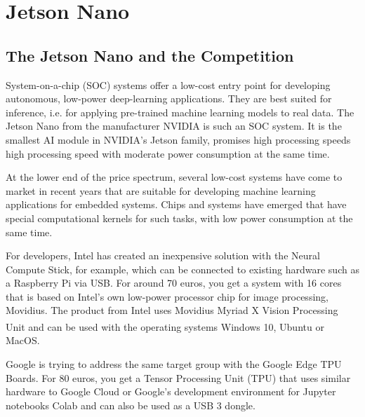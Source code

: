 %
%
%



\chapter{Jetson Nano}

\section{The Jetson Nano and the Competition}

System-on-a-chip (SOC) systems offer a low-cost entry point for developing autonomous, low-power deep-learning applications. They are best suited for inference, i.e. for applying 
pre-trained machine learning models to real data. The Jetson Nano from the manufacturer NVIDIA is such an SOC system. It is the smallest AI module in NVIDIA's Jetson family, promises high processing speeds 
high processing speed with moderate power consumption at the same time. \cite{JetsonGettingStarted:2019}



\bigskip

At the lower end of the price spectrum, several low-cost systems have come to market in recent years that are suitable for developing machine learning applications for embedded systems. Chips and systems have emerged that have special computational kernels for such tasks, with low power consumption at the same time.

For developers, Intel has created an inexpensive solution with the Neural Compute Stick, for example, which can be connected to existing hardware such as a Raspberry Pi via USB. For around 70 euros, you get a system with 16 cores that is based on Intel's own low-power processor chip for image processing, Movidius. The product from Intel uses Movidius Myriad X Vision Processing Unit and can be used with the operating systems Windows\textsuperscript{\textregistered} 10, Ubuntu or MacOS. \cite{IntelStickDataSheet:2019}


\bigskip

Google is trying to address the same target group with the Google Edge TPU Boards. For 80 euros, you get a Tensor Processing Unit (TPU) that uses similar hardware to Google Cloud or Google's development environment for Jupyter notebooks Colab and can also be used as a USB 3 dongle.
\cite{Vincent:2018,GoogleTensorFlowModel:2019,GoogleCoral:2019} 



